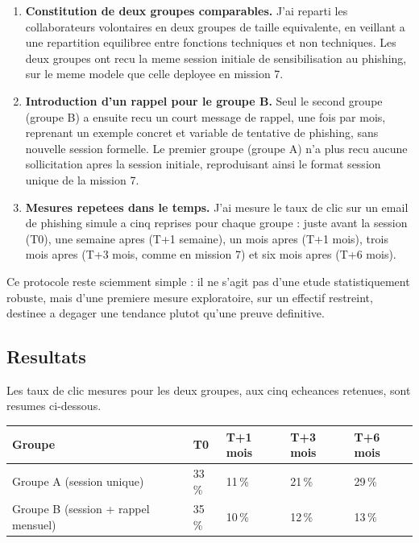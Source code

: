 \documentclass[11pt,a4paper]{article}
\begin{document}
\begin{enumerate}[label=\textbf{Etape \arabic*.}]
\item \textbf{Constitution de deux groupes comparables.} J'ai reparti les collaborateurs volontaires en deux groupes de taille equivalente, en veillant a une repartition equilibree entre fonctions techniques et non techniques. Les deux groupes ont recu la meme session initiale de sensibilisation au phishing, sur le meme modele que celle deployee en mission 7.
\item \textbf{Introduction d'un rappel pour le groupe B.} Seul le second groupe (groupe B) a ensuite recu un court message de rappel, une fois par mois, reprenant un exemple concret et variable de tentative de phishing, sans nouvelle session formelle. Le premier groupe (groupe A) n'a plus recu aucune sollicitation apres la session initiale, reproduisant ainsi le format \guillemotleft session unique \guillemotright de la mission 7.
\item \textbf{Mesures repetees dans le temps.} J'ai mesure le taux de clic sur un email de phishing simule a cinq reprises pour chaque groupe : juste avant la session (T0), une semaine apres (T+1 semaine), un mois apres (T+1 mois), trois mois apres (T+3 mois, comme en mission 7) et six mois apres (T+6 mois).
\end{enumerate}

Ce protocole reste sciemment simple : il ne s'agit pas d'une etude statistiquement robuste, mais d'une premiere mesure exploratoire, sur un effectif restreint, destinee a degager une tendance plutot qu'une preuve definitive.

\subsection{Resultats}

Les taux de clic mesures pour les deux groupes, aux cinq echeances retenues, sont resumes ci-dessous.

\begin{center}
\small
\begin{tabular}{@{}p{4.6cm}p{2.0cm}p{2.0cm}p{2.0cm}p{2.0cm}@{}}
\toprule
\textbf{Groupe} & \textbf{T0} & \textbf{T+1 mois} & \textbf{T+3 mois} & \textbf{T+6 mois} \\
\midrule
Groupe A (session unique) & 33\,\% & 11\,\% & 21\,\% & 29\,\% \\
Groupe B (session + rappel mensuel) & 35\,\% & 10\,\% & 12\,\% & 13\,\% \\
\bottomrule
\end{tabular}
\end{center}
\end{document}
